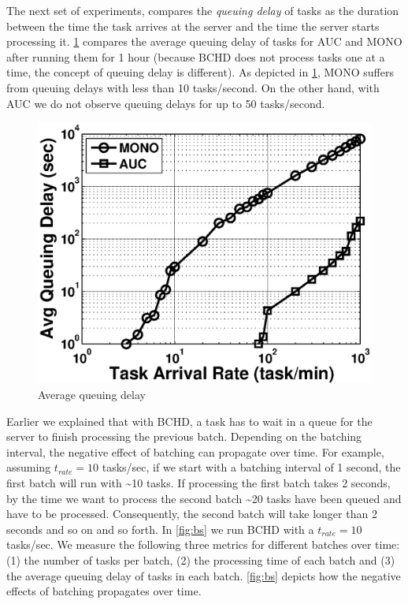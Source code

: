 The next set of experiments, compares the \emph{queuing delay} of tasks as the duration between the time the task arrives at the server and the time the server starts processing it. \cref{fig:queue} compares the average queuing delay of tasks for AUC and MONO after running them for 1 hour (because BCHD does not process tasks one at a time, the concept of queuing delay is different). As depicted in \cref{fig:queue}, MONO suffers from queuing delays with less than 10 tasks/second. On the other hand, with AUC we do not observe queuing delays for up to 50 tasks/second.

\begin{figure}[h]
	\centering
	\includegraphics[width = 0.4\columnwidth]{figures/queue.eps}
	\vspace{-0.1in}
	\caption{Average queuing delay}\label{fig:queue}
\end{figure}

Earlier we explained that with BCHD, a task has to wait in a queue for the server to finish processing the previous batch. Depending on the batching interval, the negative effect of batching can propagate over time. For example, assuming $t_{rate} = 10$ tasks/sec, if we start with a batching interval of 1 second, the first batch will run with \textasciitilde 10 tasks. If processing the first batch takes 2 seconds, by the time we want to process the second batch \textasciitilde 20 tasks have been queued and have to be processed. Consequently, the second batch will take longer than 2 seconds and so on and so forth. In \cref{fig:bs} we run BCHD with a $t_{rate} = 10$ tasks/sec. We measure the following three metrics for different batches over time: (1) the number of tasks per batch, (2) the processing time of each batch and (3) the average queuing delay of tasks in each batch. \cref{fig:bs} depicts how the negative effects of batching propagates over time.


